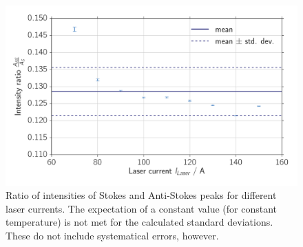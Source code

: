 \begin{figure}[htpb]
    \centering
    \includegraphics[width=0.8\linewidth]{analysis/figures/ccd_temp_rate}
    \caption{
        Ratio of intensities of Stokes and Anti-Stokes peaks for different laser currents. 
        The expectation of a constant value (for constant temperature) is not met for the 
        calculated standard deviations. These do not include systematical errors, however. 
        }
    \label{fig:ccd_temp_rate}
\end{figure}

